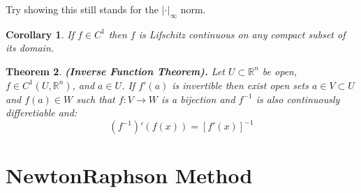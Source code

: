 \documentclass[11pt,a4paper]{article}
\theoremstyle{definition}
\theoremstyle{plain}
\newtheorem{theorem}{Theorem}[section]
\newtheorem{corollary}[theorem]{Corollary}
\newcommand{\R}{\mathbb{R}}
\renewcommand{\tt}[1]{\textnormal{\textbf{(#1).}}} %
\begin{document}
	\noindent Try showing this still stands for the $|\cdot|_\infty$ norm.
	\begin{corollary}
		If $f \in C^1$ then $f$ is Lifschitz continuous on any compact
		subset of its domain.
	\end{corollary}
	\begin{theorem}
	\tt{Inverse Function Theorem}
	Let $U \subset \R^n$ be open,
	$f \in C^1(U,\R^n)$, and $a \in U$. If $f'(a)$ is invertible then
	exist open sets $a \in V \subset U$ and $f(a) \in W$ such that
	$f \colon V \to W$ is a bijection and $f^{-1}$ is also continuously 
	differetiable and:
	\[
		(f^{-1})'(f(x)) = [f'(x)]^{-1}
	\]
	\end{theorem}
	
	
	\newpage
	
  \section{Newton\textendash{}Raphson Method}
	
	\newpage
	
\end{document}
